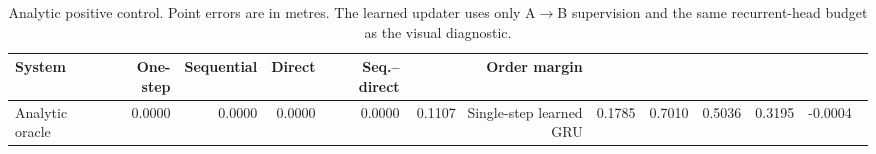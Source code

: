 \begin{table}[t]
\centering
\small
\caption{Analytic positive control. Point errors are in metres. The learned updater uses only A$\rightarrow$B supervision and the same recurrent-head budget as the visual diagnostic.}
\label{tab:se3_positive}
\begin{tabular}{lrrrrr}
\toprule
System & One-step & Sequential & Direct & Seq.--direct & Order margin \\
\midrule
Analytic oracle & 0.0000 & 0.0000 & 0.0000 & 0.0000 & 0.1107 \
Single-step learned GRU & 0.1785 & 0.7010 & 0.5036 & 0.3195 & -0.0004 \
\bottomrule
\end{tabular}
\end{table}
